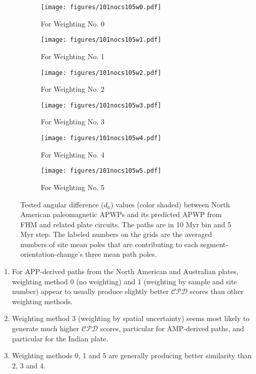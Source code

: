 \begin{figure*}
	\centering
	\begin{subfigure}{.495\textwidth}
		\texttt{[image: figures/101nocs105w0.pdf]}
		\caption{For Weighting No. 0}\label{fig-na-daw0}
	\end{subfigure}
	\vspace{.1em}
	\begin{subfigure}{.495\textwidth}
		\texttt{[image: figures/101nocs105w1.pdf]}
		\caption{For Weighting No. 1}\label{fig-na-daw1}
	\end{subfigure}
	\vspace{.1em}
	\begin{subfigure}{.495\textwidth}
		\texttt{[image: figures/101nocs105w2.pdf]}
		\caption{For Weighting No. 2}\label{fig-na-daw2}
	\end{subfigure}
	\vspace{.1em}
	\begin{subfigure}{.495\textwidth}
		\texttt{[image: figures/101nocs105w3.pdf]}
		\caption{For Weighting No. 3}\label{fig-na-daw3}
	\end{subfigure}
	\vspace{.1em}
	\begin{subfigure}{.495\textwidth}
		\texttt{[image: figures/101nocs105w4.pdf]}
		\caption{For Weighting No. 4}\label{fig-na-daw4}
	\end{subfigure}
	\vspace{.1em}
	\begin{subfigure}{.495\textwidth}
		\texttt{[image: figures/101nocs105w5.pdf]}
		\caption{For Weighting No. 5}\label{fig-na-daw5}
	\end{subfigure}
	\caption[dl of each pair of segment-oreintation-changes for North American
10/5 Myr APWPs]{Tested angular difference ($d_a$) values (color shaded) between
North American paleomagnetic APWPs and its predicted APWP from FHM and related
plate circuits. The paths are in 10 Myr bin and 5 Myr step. The labeled numbers
on the grids are the averaged numbers of site mean poles that are contributing
to each segment-orientation-change's three mean path poles.}\label{fig-nada}
\end{figure*}
%
\begin{enumerate}
  \item For APP-derived paths from the North American and Australian plates,
		weighting method 0 (no weighting) and 1 (weighting by sample and site
		number) appear to usually produce slightly better $\mathcal{CPD}$ scores
		than other weighting methods.
  \item Weighting method 3 (weighting by spatial uncertainty) seems most likely
		to generate much higher $\mathcal{CPD}$ scores, particular for
		AMP-derived paths, and particular for the Indian plate.
  \item Weighting methods 0, 1 and 5 are generally producing better similarity
		than 2, 3 and 4.
\end{enumerate}


